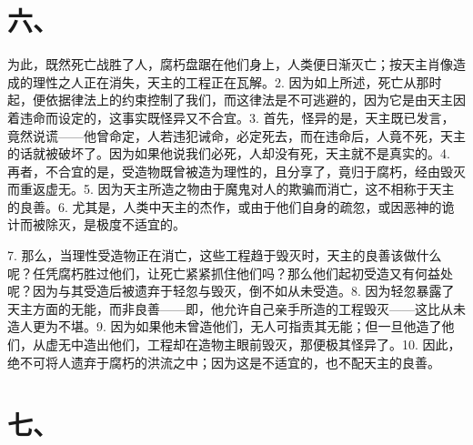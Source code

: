 
\section{六、}

为此，既然死亡战胜了人，腐朽盘踞在他们身上，人类便日渐灭亡；按天主肖像造成的理性之人正在消失，天主的工程正在瓦解。2. 因为如上所述，死亡从那时起，便依据律法上的约束控制了我们，而这律法是不可逃避的，因为它是由天主因着违命而设定的，这事实既怪异又不合宜。3. 首先，怪异的是，天主既已发言，竟然说谎——他曾命定，人若违犯诫命，必定死去，而在违命后，人竟不死，天主的话就被破坏了。因为如果他说我们必死，人却没有死，天主就不是真实的。4. 再者，不合宜的是，受造物既曾被造为理性的，且分享了，竟归于腐朽，经由毁灭而重返虚无。5. 因为天主所造之物由于魔鬼对人的欺骗而消亡，这不相称于天主的良善。6. 尤其是，人类中天主的杰作，或由于他们自身的疏忽，或因恶神的诡计而被除灭，是极度不适宜的。\par

7. 那么，当理性受造物正在消亡，这些工程趋于毁灭时，天主的良善该做什么呢？任凭腐朽胜过他们，让死亡紧紧抓住他们吗？那么他们起初受造又有何益处呢？因为与其受造后被遗弃于轻忽与毁灭，倒不如从未受造。8. 因为轻忽暴露了天主方面的无能，而非良善——即，他允许自己亲手所造的工程毁灭——这比从未造人更为不堪。9. 因为如果他未曾造他们，无人可指责其无能；但一旦他造了他们，从虚无中造出他们，工程却在造物主眼前毁灭，那便极其怪异了。10. 因此，绝不可将人遗弃于腐朽的洪流之中；因为这是不适宜的，也不配天主的良善。\par


\section{七、}


